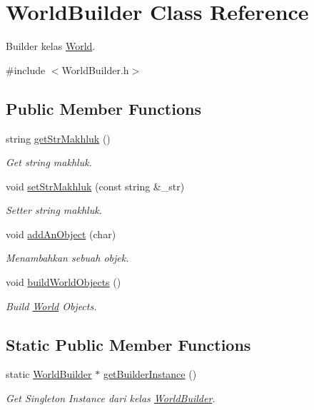 \hypertarget{class_world_builder}{}\section{World\+Builder Class Reference}
\label{class_world_builder}


Builder kelas \hyperlink{class_world}{World}.  




{\ttfamily \#include $<$World\+Builder.\+h$>$}

\subsection*{Public Member Functions}
\begin{DoxyCompactItemize}
\item 
string \hyperlink{class_world_builder_a9fca5be466395c4367aa5d6eb7e2020f}{get\+Str\+Makhluk} ()
\begin{DoxyCompactList}\small\item\em Get string makhluk. \end{DoxyCompactList}\item 
void \hyperlink{class_world_builder_abcb1fda856eebc76d5f5d3a9cf5127f5}{set\+Str\+Makhluk} (const string \&\+\_\+str)
\begin{DoxyCompactList}\small\item\em Setter string makhluk. \end{DoxyCompactList}\item 
void \hyperlink{class_world_builder_aa3de65bfa04c00b884fd290f44c395c8}{add\+An\+Object} (char)
\begin{DoxyCompactList}\small\item\em Menambahkan sebuah objek. \end{DoxyCompactList}\item 
void \hyperlink{class_world_builder_ac063d96facdcd9c1c34e69e418d6f733}{build\+World\+Objects} ()
\begin{DoxyCompactList}\small\item\em Build \hyperlink{class_world}{World} Objects. \end{DoxyCompactList}\end{DoxyCompactItemize}
\subsection*{Static Public Member Functions}
\begin{DoxyCompactItemize}
\item 
static \hyperlink{class_world_builder}{World\+Builder} $\ast$ \hyperlink{class_world_builder_ad6b3457a2a185135f33fde9e5939145a}{get\+Builder\+Instance} ()
\begin{DoxyCompactList}\small\item\em Get Singleton Instance dari kelas \hyperlink{class_world_builder}{World\+Builder}. \end{DoxyCompactList}\end{DoxyCompactItemize}


